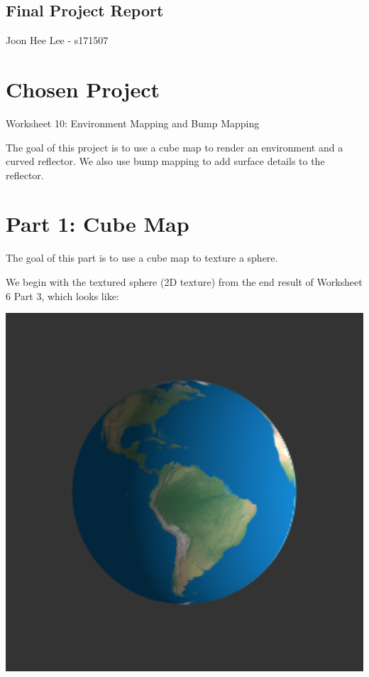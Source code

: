 \documentclass[12pt]{article}
\begin{document}
\begin{center}
\section*{Final Project Report}
Joon Hee Lee - s171507
\end{center}

\section*{Chosen Project}

Worksheet 10: Environment Mapping and Bump Mapping

The goal of this project is to use a cube map to render an environment and a curved reflector. We also use bump mapping to add surface details to the reflector.

\section*{Part 1: Cube Map}

The goal of this part is to use a cube map to texture a sphere.

We begin with the textured sphere (2D texture) from the end result of Worksheet 6 Part 3, which looks like:

\begin{center}
\includegraphics[scale=0.35]{images/earth}
\end{center}
\end{document}
